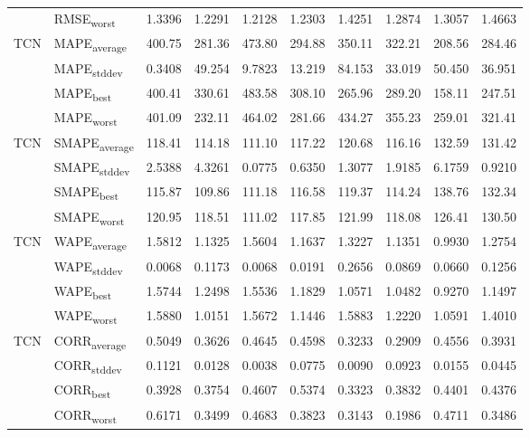 {\begin{longtable}{l l c c c c c c c c}
 & RMSE\textsubscript{worst} & 1.3396 & 1.2291 & 1.2128 & 1.2303 & 1.4251 & 1.2874 & 1.3057 & 1.4663 \\
\cmidrule(lr){2-10}
\multirow{4}{*}{TCN} & MAPE\textsubscript{average} & 400.75 & 281.36 & 473.80 & 294.88 & 350.11 & 322.21 & 208.56 & 284.46 \\
 & MAPE\textsubscript{stddev} & 0.3408 & 49.254 & 9.7823 & 13.219 & 84.153 & 33.019 & 50.450 & 36.951 \\
 & MAPE\textsubscript{best} & 400.41 & 330.61 & 483.58 & 308.10 & 265.96 & 289.20 & 158.11 & 247.51 \\
 & MAPE\textsubscript{worst} & 401.09 & 232.11 & 464.02 & 281.66 & 434.27 & 355.23 & 259.01 & 321.41 \\
\cmidrule(lr){2-10}
\multirow{4}{*}{TCN} & SMAPE\textsubscript{average} & 118.41 & 114.18 & 111.10 & 117.22 & 120.68 & 116.16 & 132.59 & 131.42 \\
 & SMAPE\textsubscript{stddev} & 2.5388 & 4.3261 & 0.0775 & 0.6350 & 1.3077 & 1.9185 & 6.1759 & 0.9210 \\
 & SMAPE\textsubscript{best} & 115.87 & 109.86 & 111.18 & 116.58 & 119.37 & 114.24 & 138.76 & 132.34 \\
 & SMAPE\textsubscript{worst} & 120.95 & 118.51 & 111.02 & 117.85 & 121.99 & 118.08 & 126.41 & 130.50 \\
\cmidrule(lr){2-10}
\multirow{4}{*}{TCN} & WAPE\textsubscript{average} & 1.5812 & 1.1325 & 1.5604 & 1.1637 & 1.3227 & 1.1351 & 0.9930 & 1.2754 \\
 & WAPE\textsubscript{stddev} & 0.0068 & 0.1173 & 0.0068 & 0.0191 & 0.2656 & 0.0869 & 0.0660 & 0.1256 \\
 & WAPE\textsubscript{best} & 1.5744 & 1.2498 & 1.5536 & 1.1829 & 1.0571 & 1.0482 & 0.9270 & 1.1497 \\
 & WAPE\textsubscript{worst} & 1.5880 & 1.0151 & 1.5672 & 1.1446 & 1.5883 & 1.2220 & 1.0591 & 1.4010 \\
\cmidrule(lr){2-10}
\multirow{4}{*}{TCN} & CORR\textsubscript{average} & 0.5049 & 0.3626 & 0.4645 & 0.4598 & 0.3233 & 0.2909 & 0.4556 & 0.3931 \\
 & CORR\textsubscript{stddev} & 0.1121 & 0.0128 & 0.0038 & 0.0775 & 0.0090 & 0.0923 & 0.0155 & 0.0445 \\
 & CORR\textsubscript{best} & 0.3928 & 0.3754 & 0.4607 & 0.5374 & 0.3323 & 0.3832 & 0.4401 & 0.4376 \\
 & CORR\textsubscript{worst} & 0.6171 & 0.3499 & 0.4683 & 0.3823 & 0.3143 & 0.1986 & 0.4711 & 0.3486 \\

\end{longtable}}
